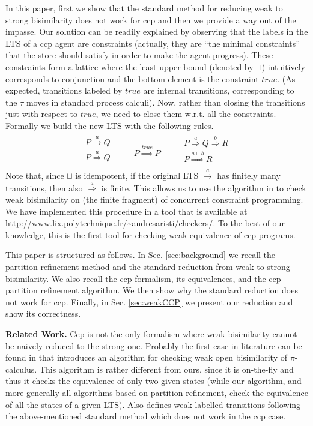 \documentclass[copyright,creativecommons]{eptcs}
\newcommand{\rrarrow}{\longrightarrow}
\newcommand{\trans}[1]{\stackrel{#1}{\rrarrow}}
\newcommand{\bigfrac}[2]{
\begin{array}{c}#1\\
\hline #2
\end{array}}
\newcommand{\newtrans}[1]{\stackrel{#1}{\Longrightarrow}}
\begin{document}
In this paper, first we show that the standard method for reducing weak to strong bisimilarity does not work for ccp and then we provide
a way out of the impasse. Our solution can be readily explained by observing that the labels in the LTS of a ccp agent
are constraints (actually, they are ``the minimal constraints'' that the store should satisfy in order to make the agent progress).
These constraints form a lattice where the least upper bound (denoted by $\sqcup$) intuitively corresponds to conjunction and
the bottom element is the constraint $true$. (As expected, transitions labeled by $true$ are internal transitions,
corresponding to the $\tau$ moves in standard process calculi).
Now, rather than closing the transitions just with respect to $true$, we need to close them w.r.t. all the constraints.
Formally we build the new LTS with the following rules.
\[\begin{array}{c}
 \bigfrac{P \trans{a}Q}{P \newtrans{a} Q} \qquad
 \bigfrac{}{P \newtrans{true} P} \qquad
 \bigfrac{P \newtrans{a} Q \newtrans{b} R }{P \newtrans{a\sqcup b} R} \\
\end{array}\]
Note that, since $\sqcup$ is idempotent, if the original LTS $\trans{a}$ has finitely many transitions, then also $\newtrans{a}$ is finite.
This allows us to use the algorithm in \cite{Aristizabal:12:SAC} to check weak bisimilarity on (the finite fragment)
of concurrent constraint programming. We have implemented this procedure in a tool that is available at \url{http://www.lix.polytechnique.fr/~andresaristi/checkers/}.
To the best of our knowledge, this is the first tool for checking weak equivalence of ccp programs.

This paper is structured as follows. In Sec. \ref{sec:background} we recall the partition refinement method and the standard reduction from weak to strong bisimilarity. We also recall the ccp formalism, its equivalences, and the ccp partition refinement algorithm. We then show why the standard reduction does not work for ccp. Finally, in Sec. \ref{sec:weakCCP} we present our reduction and show its  correctness.



{\bf Related Work.} Ccp is not the only formalism where weak bisimilarity cannot be naively reduced to the strong one.
Probably the first case in literature can be found in \cite{Victor:94:CAV} that introduces
an algorithm for checking weak open bisimilarity of $\pi$-calculus. This algorithm is rather different from ours,
since it is on-the-fly \cite{Fernandez:89:SCP} and thus it checks the equivalence of only two given states (while our algorithm,
and more generally all algorithms based on partition refinement, check the equivalence of all the states of a given LTS). Also \cite{Baldan:07:TCS} defines weak labelled transitions following the above-mentioned standard method which does not work in the ccp case.
\end{document}
